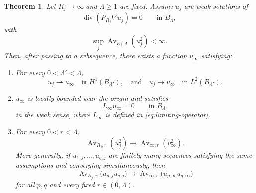 \documentclass[12pt]{amsart}
\theoremstyle{plain}
\newtheorem{theorem}{Theorem}[section]
\theoremstyle{definition}
\theoremstyle{remark}     %
\numberwithin{equation}{section}
\begin{document}
\begin{theorem}
\label{thm:weighted-G-compactness}
Let $R_j\to\infty$ and $\Lambda\geq 1$ are fixed. Assume $u_j$ are weak solutions of
\begin{equation}\label{eq:uj-equation}
    \operatorname{div}(P_{R_j}\nabla u_j)=0
    \qquad\text{in }B_\Lambda,
\end{equation}
with
\begin{equation}\label{eq:weighted-L2-assumption}
    \sup_j\operatorname{Av}_{R_j,\Lambda}(u_j^2)<\infty.
\end{equation}
Then, after passing to a subsequence, there exists a function $u_\infty$
satisfying:
\begin{enumerate}
\item For every $0<\Lambda'<\Lambda$,
\[
    u_j\rightharpoonup u_\infty
    \quad\text{in }H^1(B_{\Lambda'}),\quad 
    \text{and}\quad
    u_j\to u_\infty
    \quad\text{in }L^2(B_{\Lambda'}).
\]

\item  $u_\infty$ is locally bounded near the
origin and satisfies
\[
    L_\infty u_\infty=0
    \qquad\text{in }B_\Lambda.
\]
in the weak sense, where $L_{\infty}$ is defined in \cref{eq:limiting-operator}. 
\item For every $0<r<\Lambda$,
\begin{equation}\label{eq:weighted-mass-convergence}
    \operatorname{Av}_{R_j,r}(u_j^2)
    \to
    \operatorname{Av}_{\infty,r}(u_\infty^2).
\end{equation}
More generally, if
$u_{1,j},\ldots,u_{q,j}$ are finitely many sequences satisfying the
same assumptions and converging simultaneously, then
\begin{equation}\label{eq:cross-mass-convergence}
    \operatorname{Av}_{R_j,r}
    \bigl(u_{p,j}u_{q,j}\bigr)
    \to
    \operatorname{Av}_{\infty,r}
    \bigl(u_{p,\infty}u_{q,\infty}\bigr)
\end{equation}
for all $p,q$ and every fixed $r\in(0,\Lambda)$.


\end{enumerate}
\end{theorem}
\end{document}
